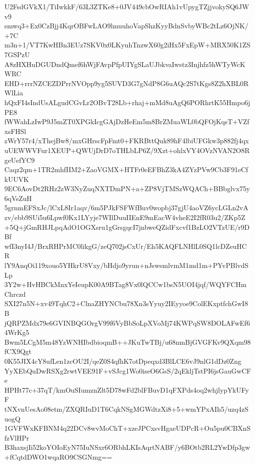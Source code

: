 U2FsdGVkX1/TiIwkkF/63L3ZTKe8+0JV449cbOwRIAh1vUpygTZjjvokySQ6JWv9
smwq3+Ex0CzBjj4KqrOBFwLAO9lmuuhoVapShzKyyBdnSvbyWBc2tLz6OjNK/+7C
m3n+1/VT7KwHBn3EUz7SKV0x0LKyuhTnzwX60g2iHx5FxEpW+MRX50K1ZS7GSPzU
A8zHXHuDGUDndQmef6hWjFAvpPfpUIYgSLaUJbkvaIwstz3Injhfz5hWTyWcKWRC
EHD+rrrNZCEZDPrrNVOpp9yg5SUVD3G7gNdP8G6uAQc2S7tKgs8Z2hXBL0RWlLia
hQxFI4sIndUsALgudCGvLr2OBvT28Lb+rhaj+mMd8uAgQ6PORhrtK55Hmpo6jPE8
fWWahLzIwP9J5mZT0XPGkIcgGAjDzHeEm5m8BrZMuaWL0bQFOjKqsT+VZfxsFHSl
zWrY57r4/xThejBw8/mxGHrscFpFmt0+FKRBttQuk89hF4lbiUFGkw3p882fj4qx
uUEWWVFur1XEUP+QWUjDrD7oTHLbLP6Z/9Xzt+ohlxVY4OVzNVAN2O8RgeUefYC9
Caqz2qm+1TR2mhfIIM2+ZaoVGMX+HTFr0eEFBhZ3kA4ZYzPVw9Cb3F91eCfkUUVK
9EC6AovDt2RHz2zW3NyZuqNXTDmPN+a+ZP8VjTMSzWQACh+BBbglvx75y6qVsZuH
5grnmEFSxJc/lCxL8Ir1aqv/6m5PJkFSFWfBuv0wopbj37gjU4aoVZ6ycLGLn2vA
zv/ebb9SUi5u6Lpwf0Kx1LYyje7WIlDuuIIEnE9mEacW4vheE2I2fR03u2/ZKp5Z
+5Q+jGmRHJLpqAdO1OGXsru1gGrsgqcI7jnbweQZidFxcvf1BzLO2VTzUE/r9DBf
wfI3nyI4J/BrxRHPrMC0likgG/zeQ702jsCxUr/Eh5KAQFLNHlL0SQ1lcDZeuHCR
lY9AnqOi119xouo5YHkrU8Vxy/bHdjo9yrun+nJswsmlvmM1md1m+PYvPBlvdSLp
3Y2w+HvHBCkMnxYeIeupK00A9BTag8Vx0lQCCw1bsN5UOI4jqf/WQYFCHmChrczd
SXI27n5N+xv49TqhC2+ClnaZHYNCbu78Xn3sYyuy2IEyyoe9ColEKxptfchGwI8B
jQRPZMdx79e6GVINBQGOrgV99f6VyBbSoLpXVoMj74KWPqSW8DOLAFwEf64WrKg5
Bwm5LCgM5m48YzWNHIbdbioqmB++JKuTwTBj/u68nmBjGVGFKv9QXqm98fCX9Qgt
0K55JIX4cY8ufLen1zcOU2I/qeZ0S4qfhK7otDpeqxd3BlLCE6vJ9nlG1dDz0Zng
YyXEbQuDwRSXg2rwtVEE91F+vSJcg1Wo0iseO6GsS/2qEkljTstPI6jsGauGwCFe
HPHt77c+37qT/kmOuSIumznZlt5D78wFd2blFBuvD1qFXPds4oq2whjlypYkUFyF
tNXvnUesAo08etm/ZXQRIuD1T6CqkNSgMGWdtzXi8+5+wmYPxAIh5/uzq4zSuogQ
1GVFWxKFBNM4q22DCv8wvMoChT+xzeJPCxsvHgaeUDPcR+Ou5pu0CBXnSfzVlHPr
B3haxsjIi52koYOIoEyN75IuNSxr6ORbhLKIsAqrtNABF/y6BOtb2RL2YwDfp3gw
+fCqtdDWO1wqaRO9CSGNmg==
